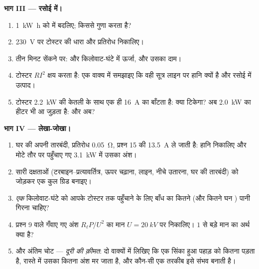 \begin{problem}[{सप्ताहांत समस्या --- एक किलोवाट-घंटे की हज़ार किलोमीटर
लंबी यात्रा, गिरते पानी से लेकर सिंकती रोटी तक, और सफ़र का पूरा
हिसाब}]
\medskip
\noindent\textbf{भाग III --- रसोई में।}
\begin{enumerate}[resume]
  \item \qty{1}{kW.h} को  में बदलिए;  किससे गुणा करता है?
  \item \qty{230}{V} पर टोस्टर की धारा और प्रतिरोध निकालिए।
  \item तीन मिनट सेंकने पर:  और किलोवाट-घंटे में
        ऊर्जा, और उसका दाम।
  \item टोस्टर $RI^2$ क्षय करता है: एक वाक्य में समझाइए कि वही सूत्र लाइन
        पर हानि क्यों है और रसोई में उत्पाद।
  \item टोस्टर \qty{2.2}{kW} की केतली के साथ एक ही \qty{16}{A} का 
        बाँटता है: क्या  टिकेगा? अब \qty{2.0}{kW} का हीटर भी आ
        जुड़ता है: और अब?
\end{enumerate}

\medskip
\noindent\textbf{भाग IV --- लेखा-जोखा।}
\begin{enumerate}[resume]
  \item घर की अपनी तारबंदी, प्रतिरोध \qty{0.05}{\ohm}, प्रश्न 15 की
        \qty{13.5}{A} ले जाती है: हानि निकालिए और मोटे तौर पर पहुँचाए गए \qty{3.1}{kW}
        में उसका अंश।
  \item सारी दक्षताओं (टरबाइन--प्रत्यावर्तित्र, ऊपर चढ़ाना, लाइन, नीचे
        उतारना, घर की तारबंदी) को जोड़कर एक कुल ग्रिड 
        बनाइए।
  \item \emph{एक} किलोवाट-घंटे को आपके टोस्टर तक पहुँचाने के लिए
        बाँध का कितने  (और कितने घन ) पानी
        गिरना चाहिए?
  \item प्रश्न 9 वाले गँवाए गए अंश $R_\ell P/U^2$ का मान $U = \qty{20}{kV}$ पर निकालिए।
        $1$ से बड़े मान का अर्थ क्या है?
  \item और अंतिम चोट --- \emph{दूरी की क़ीमत}: दो वाक्यों में लिखिए कि एक
        सिंका हुआ  पहाड़ को कितना पड़ता है, रास्ते में
        उसका कितना अंश मर जाता है, और कौन-सी एक तरकीब इसे संभव बनाती है।
\end{enumerate}
\end{problem}
